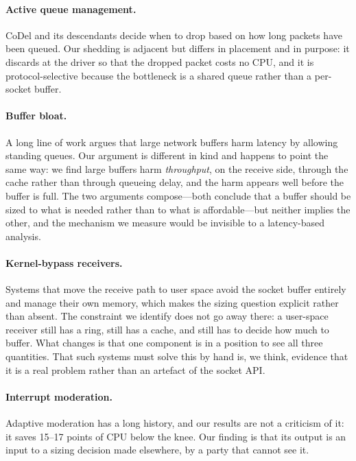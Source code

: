 \documentclass[letterpaper,twocolumn,10pt]{article}
\begin{document}
\paragraph{Active queue management.} CoDel and its descendants decide when to
drop based on how long packets have been queued. Our shedding is adjacent but
differs in placement and in purpose: it discards at the driver so that the
dropped packet costs no CPU, and it is protocol-selective because the bottleneck
is a shared queue rather than a per-socket buffer.

\paragraph{Buffer bloat.} A long line of work argues that large network buffers
harm latency by allowing standing queues. Our argument is different in kind and
happens to point the same way: we find large buffers harm \emph{throughput}, on
the receive side, through the cache rather than through queueing delay, and the
harm appears well before the buffer is full. The two arguments compose---both
conclude that a buffer should be sized to what is needed rather than to what is
affordable---but neither implies the other, and the mechanism we measure would
be invisible to a latency-based analysis.

\paragraph{Kernel-bypass receivers.} Systems that move the receive path to user
space avoid the socket buffer entirely and manage their own memory, which makes
the sizing question explicit rather than absent. The constraint we identify does
not go away there: a user-space receiver still has a ring, still has a cache,
and still has to decide how much to buffer. What changes is that one component
is in a position to see all three quantities. That such systems must solve this
by hand is, we think, evidence that it is a real problem rather than an artefact
of the socket API.

\paragraph{Interrupt moderation.} Adaptive moderation has a long history, and
our results are not a criticism of it: it saves 15--17 points of CPU below the
knee. Our finding is that its output is an input to a sizing decision made
elsewhere, by a party that cannot see it.
\end{document}

